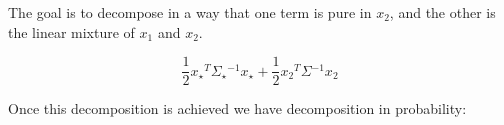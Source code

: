 \documentclass[twoside, uplatex]{article}
\newcommand{\transpose}{{}^T}
\newcommand{\inverse}{{}^{-1}}
\newcommand{\half}{\frac{1}{2}}
\begin{document}
The goal is to decompose in a way that one term is pure in $x_2$, and the other is the linear mixture of $x_1$ and $x_2$.  

\begin{equation}
    \half x_\star\transpose \Sigma_\star\inverse x_\star + \half x_2 \transpose \Sigma \inverse x_2
\end{equation}

Once this decomposition is achieved we have decomposition in probability:
\end{document}
